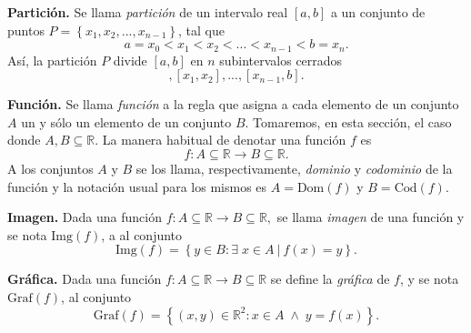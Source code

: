 \begin{definition}{\textbf{Partición.}}
    Se llama \textit{partición} de un intervalo real $[a,b]$ a un conjunto de puntos $P=\left\{x_1,x_2,...,x_{n-1}\right\}$, tal que
    \begin{equation*}
        a=x_0<x_1<x_2<...<x_{n-1}<b=x_n.
    \end{equation*}
    Así, la partición $P$ divide $[a,b]$ en $n$ subintervalos cerrados
    \begin{equation*}
        [a,x_1],[x_1,x_2],...,[x_{n-1},b].
    \end{equation*}
\end{definition}

\begin{definition}{\textbf{Función.}}
   Se llama \textit{función} a la regla que asigna a cada elemento de un conjunto
    $A$  un y s\'olo un elemento de un conjunto $B$. Tomaremos, en esta secci\'on,  el caso  donde $A, B \subseteq \mathbb{R}.$   La manera habitual de denotar una funci\'on $f$ es $$f: A \subseteq \mathbb{R} \rightarrow B \subseteq \mathbb{R}.$$  A los conjuntos $A$ y $B$  se los llama, respectivamente, \textit{dominio}  y \textit{codominio} de la funci\'on y  la notaci\'on usual para los mismos  es  $A=\text{Dom}(f)$ y $B=\text{Cod}(f)$.
    \label{def:FuncMate1}
\end{definition}


\begin{definition} {\textbf{Imagen.}}
    Dada una funci\'on $f: A \subseteq \mathbb{R} \rightarrow B \subseteq \mathbb{R},$  se llama \textit{imagen} de una función y se nota  $\text{Img}(f)$, a
    al conjunto 
    \begin{equation*}
        \text{Img}(f) = \left\{ y\in B: \exists\;x\in A\:|\:f(x)=y \right\}.    
    \end{equation*}
\end{definition}

\begin{definition}{\textbf{Gráfica.}}
    \label{def:grafm1}
   Dada una función $f: A \subseteq \mathbb{R} \rightarrow B \subseteq \mathbb{R}$ se define la \textit{gráfica} de $f$, y se nota  $\text{Graf}(f)$, al conjunto
    \begin{equation*}
        \text{Graf}(f) = \left\{ (x,y)\in \mathbb{R}^{2}: x \in A\;\land\;y=f(x)\right\}.    
    \end{equation*}
\end{definition}



